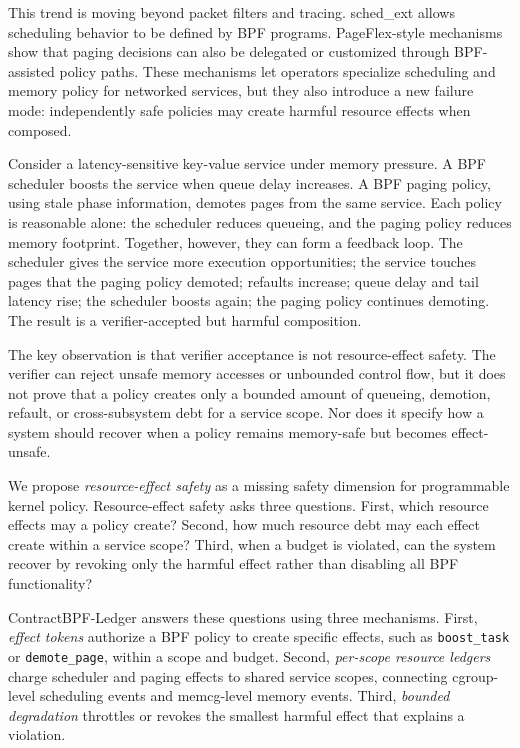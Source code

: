 \documentclass[letterpaper,twocolumn,10pt]{article}
\newcommand{\sys}{ContractBPF-Ledger\xspace}
\begin{document}
This trend is moving beyond packet filters and tracing. sched\_ext allows scheduling behavior to be defined by BPF programs. PageFlex-style mechanisms show that paging decisions can also be delegated or customized through BPF-assisted policy paths. These mechanisms let operators specialize scheduling and memory policy for networked services, but they also introduce a new failure mode: independently safe policies may create harmful resource effects when composed.

Consider a latency-sensitive key-value service under memory pressure. A BPF scheduler boosts the service when queue delay increases. A BPF paging policy, using stale phase information, demotes pages from the same service. Each policy is reasonable alone: the scheduler reduces queueing, and the paging policy reduces memory footprint. Together, however, they can form a feedback loop. The scheduler gives the service more execution opportunities; the service touches pages that the paging policy demoted; refaults increase; queue delay and tail latency rise; the scheduler boosts again; the paging policy continues demoting. The result is a verifier-accepted but harmful composition.

The key observation is that verifier acceptance is not resource-effect safety. The verifier can reject unsafe memory accesses or unbounded control flow, but it does not prove that a policy creates only a bounded amount of queueing, demotion, refault, or cross-subsystem debt for a service scope. Nor does it specify how a system should recover when a policy remains memory-safe but becomes effect-unsafe.

We propose \emph{resource-effect safety} as a missing safety dimension for programmable kernel policy. Resource-effect safety asks three questions. First, which resource effects may a policy create? Second, how much resource debt may each effect create within a service scope? Third, when a budget is violated, can the system recover by revoking only the harmful effect rather than disabling all BPF functionality?

\sys answers these questions using three mechanisms. First, \emph{effect tokens} authorize a BPF policy to create specific effects, such as \texttt{boost\_task} or \texttt{demote\_page}, within a scope and budget. Second, \emph{per-scope resource ledgers} charge scheduler and paging effects to shared service scopes, connecting cgroup-level scheduling events and memcg-level memory events. Third, \emph{bounded degradation} throttles or revokes the smallest harmful effect that explains a violation.
\end{document}
